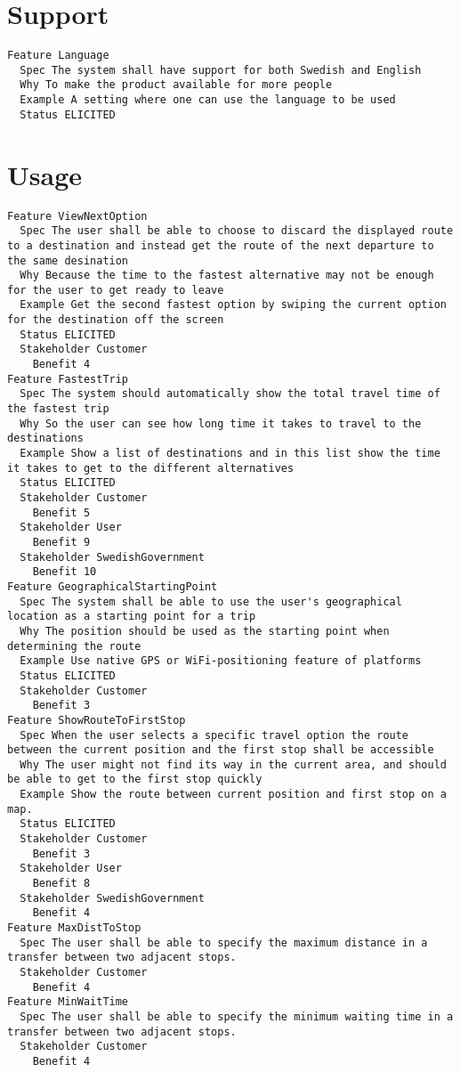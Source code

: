         
       \section{Support}


\begin{lstlisting}
Feature Language
  Spec The system shall have support for both Swedish and English
  Why To make the product available for more people
  Example A setting where one can use the language to be used
  Status ELICITED

\end{lstlisting}
    
        
       \section{Usage}


\begin{lstlisting}
Feature ViewNextOption
  Spec The user shall be able to choose to discard the displayed route to a destination and instead get the route of the next departure to the same desination
  Why Because the time to the fastest alternative may not be enough for the user to get ready to leave
  Example Get the second fastest option by swiping the current option for the destination off the screen
  Status ELICITED
  Stakeholder Customer
    Benefit 4
Feature FastestTrip
  Spec The system should automatically show the total travel time of the fastest trip
  Why So the user can see how long time it takes to travel to the destinations
  Example Show a list of destinations and in this list show the time it takes to get to the different alternatives
  Status ELICITED
  Stakeholder Customer
    Benefit 5
  Stakeholder User
    Benefit 9
  Stakeholder SwedishGovernment
    Benefit 10
Feature GeographicalStartingPoint
  Spec The system shall be able to use the user's geographical location as a starting point for a trip
  Why The position should be used as the starting point when determining the route
  Example Use native GPS or WiFi-positioning feature of platforms
  Status ELICITED
  Stakeholder Customer
    Benefit 3
Feature ShowRouteToFirstStop
  Spec When the user selects a specific travel option the route between the current position and the first stop shall be accessible
  Why The user might not find its way in the current area, and should be able to get to the first stop quickly
  Example Show the route between current position and first stop on a map.
  Status ELICITED
  Stakeholder Customer
    Benefit 3
  Stakeholder User
    Benefit 8
  Stakeholder SwedishGovernment
    Benefit 4
Feature MaxDistToStop
  Spec The user shall be able to specify the maximum distance in a transfer between two adjacent stops.
  Stakeholder Customer
    Benefit 4
Feature MinWaitTime
  Spec The user shall be able to specify the minimum waiting time in a transfer between two adjacent stops.
  Stakeholder Customer
    Benefit 4

\end{lstlisting}
    
